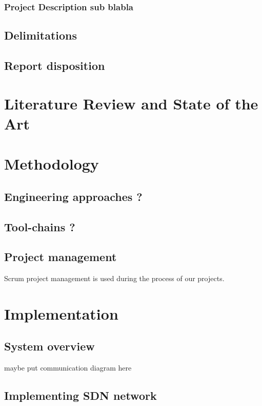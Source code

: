 \documentclass[11pt, titlepage]{article} %
\begin{document}
\subsubsection{Project Description sub blabla}

\subsection{Delimitations}

\subsection{Report disposition}

\clearpage
\section{Literature Review and State of the Art}

\clearpage
\section{Methodology}
\subsection{Engineering approaches ?}
\subsection{Tool-chains ?}
\subsection{Project management}
Scrum project management is used during the process of our projects.

\clearpage
\section{Implementation}
\subsection{System overview}
maybe put communication diagram here
\subsection{Implementing SDN network}
\end{document}
